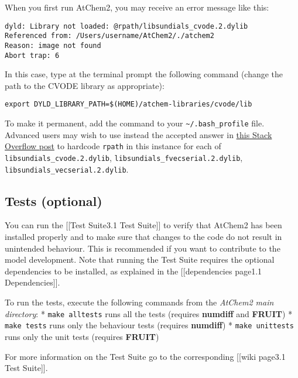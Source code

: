 When you first run AtChem2, you may receive an error message like this:

\begin{verbatim}
dyld: Library not loaded: @rpath/libsundials_cvode.2.dylib
Referenced from: /Users/username/AtChem2/./atchem2
Reason: image not found
Abort trap: 6
\end{verbatim}

In this case, type at the terminal prompt the following command (change
the path to the CVODE library as appropriate):

\begin{verbatim}
export DYLD_LIBRARY_PATH=$(HOME)/atchem-libraries/cvode/lib
\end{verbatim}

To make it permanent, add the command to your
\texttt{\textasciitilde{}/.bash\_profile} file. Advanced users may wish
to use instead the accepted answer in
\href{https://stackoverflow.com/questions/17703510/dyld-library-not-loaded-reason-image-not-loaded}{this
Stack Overflow post} to hardcode \texttt{rpath} in this instance for
each of \texttt{libsundials\_cvode.2.dylib},
\texttt{libsundials\_fvecserial.2.dylib},
\texttt{libsundials\_vecserial.2.dylib}.

\subsection{Tests (optional)}\label{tests-optional}

You can run the {[}{[}Test Suite\textbar{}3.1 Test Suite{]}{]} to verify
that AtChem2 has been installed properly and to make sure that changes
to the code do not result in unintended behaviour. This is recommended
if you want to contribute to the model development. Note that running
the Test Suite requires the optional dependencies to be installed, as
explained in the {[}{[}dependencies page\textbar{}1.1
Dependencies{]}{]}.

To run the tests, execute the following commands from the \emph{AtChem2
main directory}: * \texttt{make\ alltests} runs all the tests (requires
\textbf{numdiff} and \textbf{FRUIT}) * \texttt{make\ tests} runs only
the behaviour tests (requires \textbf{numdiff}) *
\texttt{make\ unittests} runs only the unit tests (requires
\textbf{FRUIT})

For more information on the Test Suite go to the corresponding
{[}{[}wiki page\textbar{}3.1 Test Suite{]}{]}.
